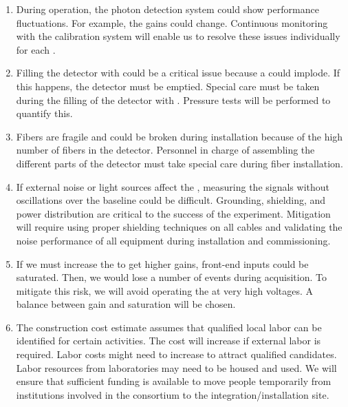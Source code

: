 \begin{enumerate}

\item During  operation, the photon detection system could show performance fluctuations. For example, the  gains could change. Continuous monitoring with the  calibration system will enable us to resolve these issues individually for each .

\item Filling the detector with  could be a critical issue because a  could implode. If this happens, the detector must be emptied. Special care must be taken during the filling of the detector with . Pressure tests will be performed to quantify this.

\item Fibers are fragile and could be broken during installation because of the high number of fibers in the detector. Personnel in charge of assembling the different parts of the detector must take special care during fiber installation.

\item If external noise or light sources affect the , measuring the signals without oscillations over the baseline could be difficult. Grounding, shielding, and power distribution are critical to the success of the experiment. Mitigation will require using proper shielding techniques on all cables and validating the noise performance of all equipment during installation and commissioning.

\item If we must increase the   to get higher gains,  front-end inputs could be saturated. Then, we would lose a number of events during acquisition. To mitigate this risk, we will avoid operating the  at very high voltages. A balance between gain and saturation will be chosen.

\item The  construction cost estimate assumes that qualified local labor can be identified for certain activities. The cost will increase if external labor is required. Labor costs might need to increase to attract qualified candidates. Labor resources from laboratories may need to be housed and used. We will ensure that sufficient funding is available to move people temporarily from institutions involved in the  consortium to the integration/installation site.


\end{enumerate}
